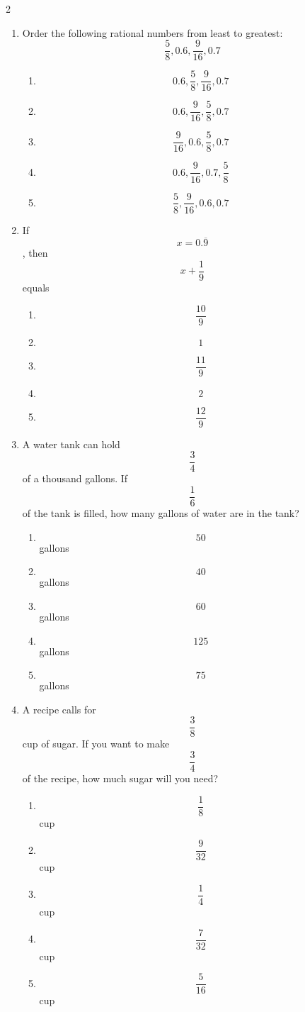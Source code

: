\documentclass[10pt]{article}
\begin{document}
\begin{multicols}{2}
\begin{enumerate}[label=\textbf{Q\arabic*.}, leftmargin=*, itemsep=6pt, parsep=0pt]
  \item \small Order the following rational numbers from least to greatest: $$\frac{5}{8}, 0.6, \frac{9}{16}, 0.7$$
  \begin{enumerate}[label=(\Alph*), leftmargin=0.6cm, nosep, itemsep=2pt]
    \item $$0.6, \frac{5}{8}, \frac{9}{16}, 0.7$$
    \item $$0.6, \frac{9}{16}, \frac{5}{8}, 0.7$$
    \item $$\frac{9}{16}, 0.6, \frac{5}{8}, 0.7$$
    \item $$0.6, \frac{9}{16}, 0.7, \frac{5}{8}$$
    \item $$\frac{5}{8}, \frac{9}{16}, 0.6, 0.7$$
  \end{enumerate}

  \item \small If $$x = 0.\overline{9}$$, then $$x + \frac{1}{9}$$ equals
  \begin{enumerate}[label=(\Alph*), leftmargin=0.6cm, nosep, itemsep=2pt]
    \item $$\frac{10}{9}$$
    \item $$1$$
    \item $$\frac{11}{9}$$
    \item $$2$$
    \item $$\frac{12}{9}$$
  \end{enumerate}

  \item \small A water tank can hold $$\frac{3}{4}$$ of a thousand gallons. If $$\frac{1}{6}$$ of the tank is filled, how many gallons of water are in the tank?
  \begin{enumerate}[label=(\Alph*), leftmargin=0.6cm, nosep, itemsep=2pt]
    \item $$50$$ gallons
    \item $$40$$ gallons
    \item $$60$$ gallons
    \item $$125$$ gallons
    \item $$75$$ gallons
  \end{enumerate}

  \item \small A recipe calls for $$\frac{3}{8}$$ cup of sugar. If you want to make $$\frac{3}{4}$$ of the recipe, how much sugar will you need?
  \begin{enumerate}[label=(\Alph*), leftmargin=0.6cm, nosep, itemsep=2pt]
    \item $$\frac{1}{8}$$ cup
    \item $$\frac{9}{32}$$ cup
    \item $$\frac{1}{4}$$ cup
    \item $$\frac{7}{32}$$ cup
    \item $$\frac{5}{16}$$ cup
  \end{enumerate}


\end{enumerate}
\end{multicols}
\end{document}

